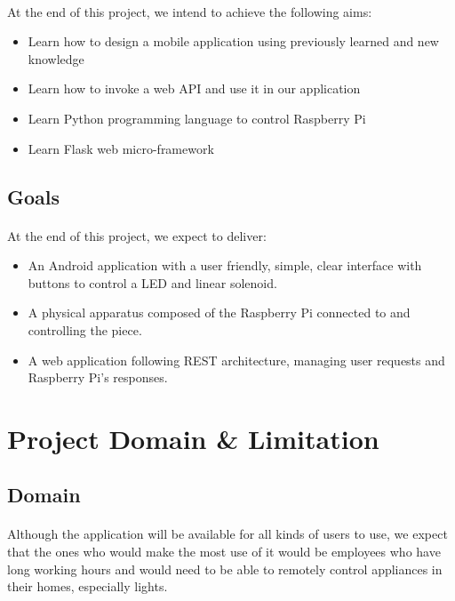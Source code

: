 \documentclass[a4paper, 12pt, oneside]{book}
\begin{document}
			\paragraph{}At the end of this project, we intend to achieve the following aims:
			\begin{itemize}
	 			\item Learn how to design a mobile application using previously learned and new knowledge
				\item Learn how to invoke a web API and use it in our application
				\item Learn Python programming language to control Raspberry Pi
				\item Learn Flask web micro-framework
			\end{itemize}
		\subsection{Goals}
			\paragraph{} At the end of this project, we expect to deliver:
			\begin{itemize}
				\item An Android application with a user friendly, simple, clear interface with buttons to control a LED and linear solenoid.
				\item A physical apparatus composed of the Raspberry Pi connected to and controlling the piece.
				\item A web application following REST architecture, managing user  requests and Raspberry Pi's responses.
			\end{itemize}
		\section{Project Domain \& Limitation}
			\subsection{Domain}
				\paragraph{} Although the application will be available for all kinds of users to use, we expect that the ones who would make the most use of it would be employees who have long working hours and would need to be able to remotely control appliances in their homes, especially lights.
\end{document}
